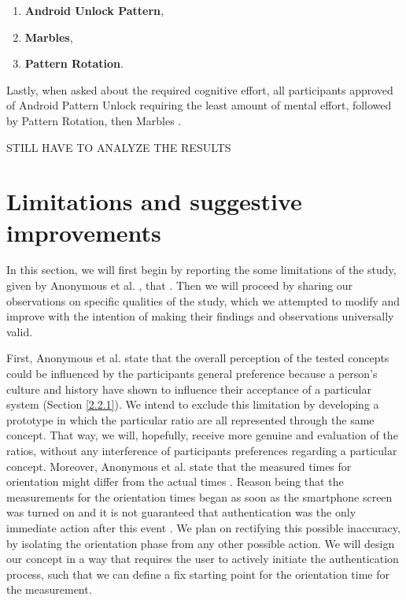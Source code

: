 \begin{enumerate}
     \item \textbf{Android Unlock Pattern},
    \item \textbf{Marbles},
    \item \textbf{Pattern Rotation}.
\end{enumerate}

Lastly, when asked about the required cognitive effort, all participants approved of Android Pattern Unlock requiring the least amount of mental effort, followed by Pattern Rotation, then Marbles \cite{anonymous}.

STILL HAVE TO ANALYZE THE RESULTS

\section{Limitations and suggestive improvements}

In this section, we will first begin by reporting the some limitations of the study, given by Anonymous et al. \cite{anonymous}, that . Then we will proceed by sharing our observations on specific qualities of the study, which we attempted to modify and improve with the intention of making their findings and observations universally valid.  

First, Anonymous et al. \cite{anonymous} state that the overall perception of the tested concepts could be influenced by the participants general preference \cite{anonymous} because a person's culture and history have shown to influence their acceptance of a particular system \cite{Harbach:2016} (Section \ref{2.2.1}). We intend to exclude this limitation by developing a prototype in which the particular ratio are all represented through the same concept. That way, we will, hopefully, receive more genuine and evaluation of the ratios, without any interference of participants preferences regarding a particular concept. Moreover, Anonymous et al. \cite{anonymous} state that the measured times for orientation might differ from the actual times \cite{anonymous}. Reason being that the measurements for the orientation times began as soon as the smartphone screen was turned on and it is not guaranteed that authentication was the only immediate action after this event \cite{anonymous}. We plan on rectifying this possible inaccuracy, by isolating the orientation phase from any other possible action. We will design our concept in a way that requires the user to actively initiate the authentication process, such that we can define a fix starting point for the orientation time for the measurement.\\

